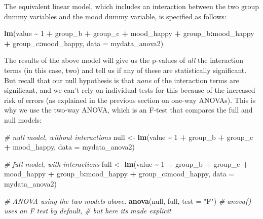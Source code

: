\documentclass[
  12pt,
]{krantz}
\newenvironment{Shaded}{\begin{snugshade}}{\end{snugshade}}
\newcommand{\CommentTok}[1]{\textcolor[rgb]{0.56,0.35,0.01}{\textit{#1}}}
\newcommand{\DataTypeTok}[1]{\textcolor[rgb]{0.13,0.29,0.53}{#1}}
\newcommand{\DecValTok}[1]{\textcolor[rgb]{0.00,0.00,0.81}{#1}}
\newcommand{\KeywordTok}[1]{\textcolor[rgb]{0.13,0.29,0.53}{\textbf{#1}}}
\newcommand{\NormalTok}[1]{#1}
\newcommand{\OperatorTok}[1]{\textcolor[rgb]{0.81,0.36,0.00}{\textbf{#1}}}
\newcommand{\StringTok}[1]{\textcolor[rgb]{0.31,0.60,0.02}{#1}}
\begin{document}
The equivalent linear model, which includes an interaction between the two group dummy variables and the mood dummy variable, is specified as follows:

\begin{Shaded}
\begin{Highlighting}[]
\KeywordTok{lm}\NormalTok{(value }\OperatorTok{\textasciitilde{}}\StringTok{ }\DecValTok{1} \OperatorTok{+}\StringTok{ }\NormalTok{group\_b }\OperatorTok{+}\StringTok{ }\NormalTok{group\_c }\OperatorTok{+}\StringTok{ }\NormalTok{mood\_happy }\OperatorTok{+}
\StringTok{           }\NormalTok{group\_b}\OperatorTok{:}\NormalTok{mood\_happy }\OperatorTok{+}\StringTok{ }\NormalTok{group\_c}\OperatorTok{:}\NormalTok{mood\_happy,}
        \DataTypeTok{data =}\NormalTok{ mydata\_anova2)}
\end{Highlighting}
\end{Shaded}

The results of the above model will give us the p-values of \emph{all} the interaction terms (in this case, two) and tell us if any of these are statistically significant. But recall that our null hypothesis is that \emph{none} of the interaction terms are significant, and we can't rely on individual tests for this because of the increased risk of errors (as explained in the previous section on one-way ANOVAs). This is why we use the two-way ANOVA, which is an F-test that compares the full and null models:

\begin{Shaded}
\begin{Highlighting}[]
\CommentTok{\# null model, without interactions}
\NormalTok{null \textless{}{-}}\StringTok{ }\KeywordTok{lm}\NormalTok{(value }\OperatorTok{\textasciitilde{}}\StringTok{ }\DecValTok{1} \OperatorTok{+}\StringTok{ }\NormalTok{group\_b }\OperatorTok{+}\StringTok{ }\NormalTok{group\_c }\OperatorTok{+}\StringTok{ }\NormalTok{mood\_happy, }\DataTypeTok{data =}\NormalTok{ mydata\_anova2)}

\CommentTok{\# full model, with interactions}
\NormalTok{full \textless{}{-}}\StringTok{ }\KeywordTok{lm}\NormalTok{(value }\OperatorTok{\textasciitilde{}}\StringTok{ }\DecValTok{1} \OperatorTok{+}\StringTok{ }\NormalTok{group\_b }\OperatorTok{+}\StringTok{ }\NormalTok{group\_c }\OperatorTok{+}\StringTok{ }\NormalTok{mood\_happy }\OperatorTok{+}\StringTok{ }\NormalTok{group\_b}\OperatorTok{:}\NormalTok{mood\_happy }\OperatorTok{+}
\StringTok{             }\NormalTok{group\_c}\OperatorTok{:}\NormalTok{mood\_happy, }\DataTypeTok{data =}\NormalTok{ mydata\_anova2)}

\CommentTok{\# ANOVA using the two models above.}
\KeywordTok{anova}\NormalTok{(null, full, }\DataTypeTok{test =} \StringTok{"F"}\NormalTok{)    }\CommentTok{\# anova() uses an F test by default,}
                                \CommentTok{\# but here it\textquotesingle{}s made explicit}
\end{Highlighting}
\end{Shaded}
\end{document}
